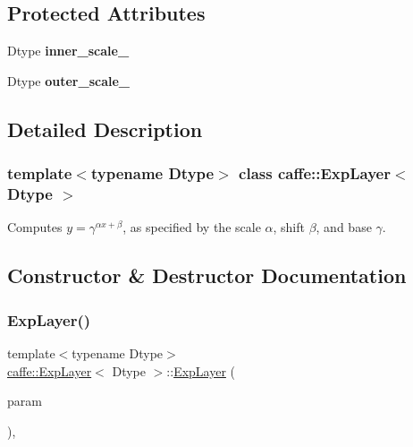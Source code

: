 \subsection*{Protected Attributes}
\begin{DoxyCompactItemize}
\item 
\mbox{\label{classcaffe_1_1_exp_layer_a60dd67dcdc7c46fb4514f25a56e43cce}} 
Dtype {\bfseries inner\+\_\+scale\+\_\+}
\item 
\mbox{\label{classcaffe_1_1_exp_layer_aeb8e9967b8c9cb57a4ff2f797dc6a36a}} 
Dtype {\bfseries outer\+\_\+scale\+\_\+}
\end{DoxyCompactItemize}


\subsection{Detailed Description}
\subsubsection*{template$<$typename Dtype$>$\newline
class caffe\+::\+Exp\+Layer$<$ Dtype $>$}

Computes $ y = \gamma ^ {\alpha x + \beta} $, as specified by the scale $ \alpha $, shift $ \beta $, and base $ \gamma $. 

\subsection{Constructor \& Destructor Documentation}
\mbox{\label{classcaffe_1_1_exp_layer_a87a0fae261ad3d2c8947f463686a6de0}} 
\subsubsection{\texorpdfstring{Exp\+Layer()}{ExpLayer()}\hspace{0.1cm}{\footnotesize\ttfamily [1/2]}}
{\footnotesize\ttfamily template$<$typename Dtype$>$ \\
\mbox{\hyperlink{classcaffe_1_1_exp_layer}{caffe\+::\+Exp\+Layer}}$<$ Dtype $>$\+::\mbox{\hyperlink{classcaffe_1_1_exp_layer}{Exp\+Layer}} (\begin{DoxyParamCaption}\item[{const \mbox{\hyperlink{classcaffe_1_1_layer_parameter}{Layer\+Parameter}} \&}]{param }\end{DoxyParamCaption})\hspace{0.3cm}{\ttfamily [inline]}, {\ttfamily [explicit]}}



